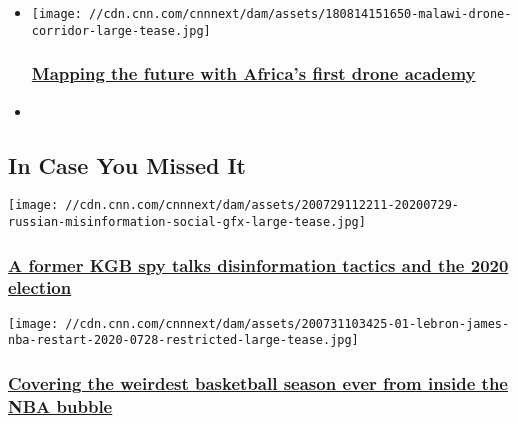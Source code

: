 \begin{itemize}
\item
  \href{/2020/02/07/africa/africa-first-drone-academy/index.html}{}

  \texttt{[image: //cdn.cnn.com/cnnnext/dam/assets/180814151650-malawi-drone-corridor-large-tease.jpg]}

  \hypertarget{mapping-the-future-with-africas-first-drone-academy}{%
  \subsubsection{\texorpdfstring{\href{/2020/02/07/africa/africa-first-drone-academy/index.html}{Mapping
  the future with Africa's first drone
  academy}}{Mapping the future with Africa's first drone academy}}\label{mapping-the-future-with-africas-first-drone-academy}}
\item
\end{itemize}

\hypertarget{in-case-you-missed-it-}{%
\subsection{In Case You Missed It~}\label{in-case-you-missed-it-}}

\href{/2020/07/30/tech/2020-election-russia-disinformation/index.html}{}

\texttt{[image: //cdn.cnn.com/cnnnext/dam/assets/200729112211-20200729-russian-misinformation-social-gfx-large-tease.jpg]}

\hypertarget{a-former-kgb-spy-talks-disinformation-tactics-and-the-2020-election}{%
\subsubsection{\texorpdfstring{\href{/2020/07/30/tech/2020-election-russia-disinformation/index.html}{A
former KGB spy talks disinformation tactics and the 2020
election}}{A former KGB spy talks disinformation tactics and the 2020 election}}\label{a-former-kgb-spy-talks-disinformation-tactics-and-the-2020-election}}

\href{/2020/07/31/media/nba-restart-bubble-reporters/index.html}{}

\texttt{[image: //cdn.cnn.com/cnnnext/dam/assets/200731103425-01-lebron-james-nba-restart-2020-0728-restricted-large-tease.jpg]}

\hypertarget{covering-the-weirdest-basketball-season-ever-from-inside-the-nba-bubble}{%
\subsubsection{\texorpdfstring{\href{/2020/07/31/media/nba-restart-bubble-reporters/index.html}{Covering
the weirdest basketball season ever from inside the NBA
bubble}}{Covering the weirdest basketball season ever from inside the NBA bubble}}\label{covering-the-weirdest-basketball-season-ever-from-inside-the-nba-bubble}}

